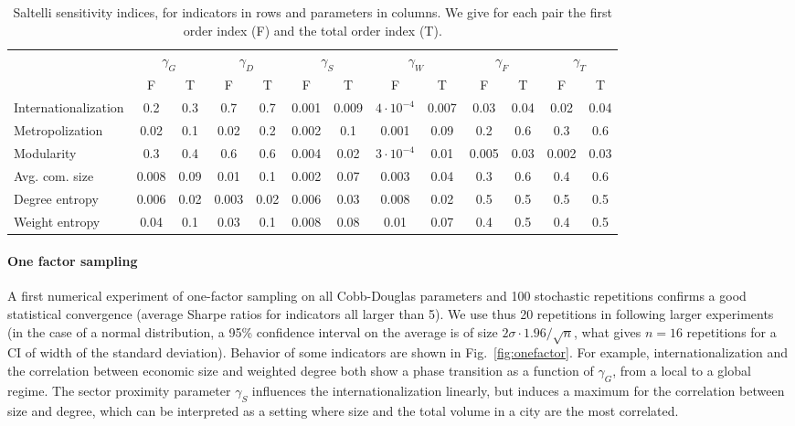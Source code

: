 \documentclass[11pt]{article}
\begin{document}
\begin{table}
\caption{Saltelli sensitivity indices, for indicators in rows and parameters in columns. We give for each pair the first order index (F) and the total order index (T).\label{tab:saltelli}}
\hspace{-1cm}\begin{tabular}{|l|c|c|c|c|c|c|c|c|c|c|c|c|}
\hline
 & \multicolumn{2}{|c|}{$\gamma_G$} & \multicolumn{2}{|c|}{$\gamma_D$} & \multicolumn{2}{|c|}{$\gamma_S$} & \multicolumn{2}{|c|}{$\gamma_W$} & \multicolumn{2}{|c|}{$\gamma_F$} & \multicolumn{2}{|c|}{$\gamma_T$} \\
 & F & T & F & T & F & T & F & T & F & T & F & T \\
 \hline
Internationalization & 0.2 & 0.3 & 0.7 & 0.7 & 0.001 & 0.009 & $4\cdot 10^{-4}$ & 0.007 & 0.03 & 0.04 & 0.02 & 0.04 \\
Metropolization & 0.02 & 0.1 & 0.02 & 0.2 & 0.002 & 0.1 & 0.001 & 0.09 & 0.2 & 0.6 & 0.3 & 0.6 \\
Modularity & 0.3 & 0.4 & 0.6 & 0.6 & 0.004 & 0.02 & $3\cdot 10^{-4}$ & 0.01 & 0.005 & 0.03 & 0.002 & 0.03 \\
Avg. com. size & 0.008 & 0.09 & 0.01 & 0.1 & 0.002 & 0.07 & 0.003 & 0.04 & 0.3 & 0.6 & 0.4 & 0.6 \\
Degree entropy & 0.006 & 0.02 & 0.003 & 0.02 & 0.006 & 0.03 & 0.008 & 0.02 & 0.5 & 0.5 & 0.5 & 0.5 \\
Weight entropy & 0.04 & 0.1 & 0.03 & 0.1 & 0.008 & 0.08 & 0.01 & 0.07 & 0.4 & 0.5 & 0.4 & 0.5 \\\hline
\end{tabular}
\end{table}



\paragraph{One factor sampling}

A first numerical experiment of one-factor sampling on all Cobb-Douglas parameters and 100 stochastic repetitions confirms a good statistical convergence (average Sharpe ratios for indicators all larger than 5). We use thus 20 repetitions in following larger experiments (in the case of a normal distribution, a 95\% confidence interval on the average is of size $2\sigma \cdot 1.96 / \sqrt{n}$, what gives $n=16$ repetitions for a CI of width of the standard deviation). Behavior of some indicators are shown in Fig.~\ref{fig:onefactor}. For example, internationalization and the correlation between economic size and weighted degree both show a phase transition as a function of $\gamma_G$, from a local to a global regime. The sector proximity parameter $\gamma_S$ influences the internationalization linearly, but induces a maximum for the correlation between size and degree, which can be interpreted as a setting where size and the total volume in a city are the most correlated.
\end{document}
